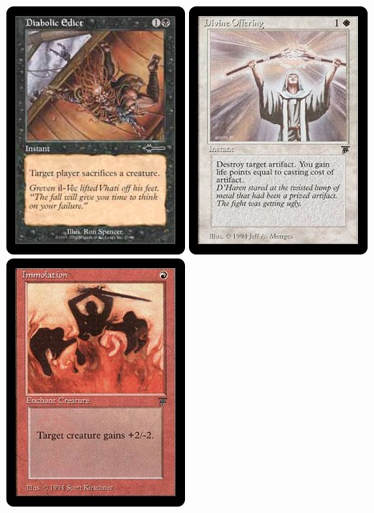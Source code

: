 \documentclass[12pt,a4paper]{article}
\begin{document}
			\begin{flushright}
			\end{flushright}

			\begin{center}
			\includegraphics{edito} \includegraphics{offering} \includegraphics{immolation}
			\end{center}
\end{document}
